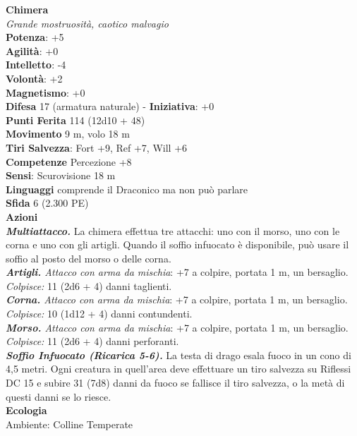 \begin{multicols}{2}
\medskip\textbf{Chimera}\\
\emph{Grande mostruosità, caotico malvagio}\\
\textbf{Potenza}: +5\\
\textbf{Agilità}: +0\\
\textbf{Intelletto}: -4\\
\textbf{Volontà}: +2\\
\textbf{Magnetismo}: +0\\
\textbf{Difesa} 17 (armatura naturale) - \textbf{Iniziativa}: +0\\
\textbf{Punti Ferita} 114 (12d10 + 48)\\
\textbf{Movimento} 9 m, volo 18 m\\
\textbf{Tiri Salvezza}: Fort +9, Ref +7, Will +6\\
\textbf{Competenze} Percezione +8\\
\textbf{Sensi}: Scurovisione 18 m\\
\textbf{Linguaggi} comprende il Draconico ma non può parlare\\
\textbf{Sfida} 6 (2.300 PE)\smallskip\\
\smallskip\textbf{Azioni}\\
\emph{\textbf{Multiattacco.}} La chimera effettua tre attacchi: uno con il morso, uno con le corna e uno con gli artigli. Quando il soffio infuocato è disponibile, può usare il soffio al posto del morso o delle corna.\\
\emph{\textbf{Artigli.} Attacco con arma da mischia}: +7 a colpire, portata 1 m, un bersaglio. \\
\emph{Colpisce:} 11 (2d6 + 4) danni taglienti.\\
\emph{\textbf{Corna.} Attacco con arma da mischia}: +7 a colpire, portata 1 m, un bersaglio.\\
\emph{Colpisce:} 10 (1d12 + 4) danni contundenti.\\
\emph{\textbf{Morso.} Attacco con arma da mischia}: +7 a colpire, portata 1 m, un bersaglio.\\
\emph{Colpisce:} 11 (2d6 + 4) danni perforanti.\\
\emph{\textbf{Soffio Infuocato (Ricarica 5-6).}} La testa di drago esala fuoco in un cono di 4,5 metri. Ogni creatura in quell'area deve effettuare un tiro salvezza su Riflessi DC 15 e subire 31 (7d8) danni da fuoco se fallisce il tiro salvezza, o la metà di questi danni se lo riesce.\\
\textbf{Ecologia}\\
Ambiente: Colline Temperate\\

\end{multicols}
